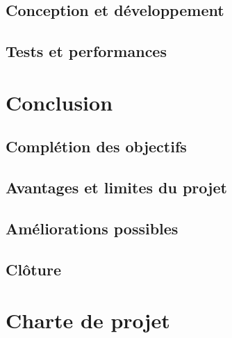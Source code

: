 \documentclass[a4paper, 12pt]{report}
\begin{document}
\section{Conception et développement}
\section{Tests et performances}

\chapter{Conclusion}
\minitoc
{}
\clearpage
\section{Complétion des objectifs}
\section{Avantages et limites du projet}
\section{Améliorations possibles}
\section{Clôture}

\appendix
\chapter{Charte de projet}
    \label{chap:AnnexeA}
    
\end{document}
